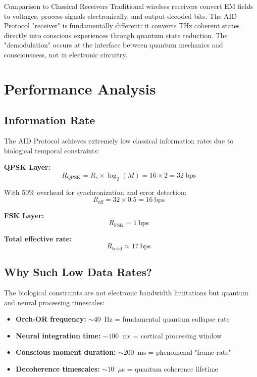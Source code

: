 \begin{calloutbox}{Comparison to Classical Receivers}
Traditional wireless receivers convert EM fields to voltages, process signals electronically, and output decoded bits. The AID Protocol "receiver" is fundamentally different: it converts THz coherent states directly into conscious experiences through quantum state reduction. The "demodulation" occurs at the interface between quantum mechanics and consciousness, not in electronic circuitry.
\end{calloutbox}

\section{Performance Analysis}

\subsection{Information Rate}

The AID Protocol achieves extremely low classical information rates due to biological temporal constraints:

\textbf{QPSK Layer:}
\begin{equation}
R_{\text{QPSK}} = R_s \times \log_2(M) = 16 \times 2 = 32~\text{bps}
\end{equation}

With 50\% overhead for synchronization and error detection:
\begin{equation}
R_{\text{eff}} = 32 \times 0.5 = 16~\text{bps}
\end{equation}

\textbf{FSK Layer:}
\begin{equation}
R_{\text{FSK}} = 1~\text{bps}
\end{equation}

\textbf{Total effective rate:}
\begin{equation}
R_{\text{total}} \approx 17~\text{bps}
\end{equation}

\subsection{Why Such Low Data Rates?}

The biological constraints are not electronic bandwidth limitations but quantum and neural processing timescales:

\begin{itemize}
\item \textbf{Orch-OR frequency:} $\sim 40$~Hz = fundamental quantum collapse rate
\item \textbf{Neural integration time:} $\sim 100$~ms = cortical processing window
\item \textbf{Conscious moment duration:} $\sim 200$~ms = phenomenal "frame rate"
\item \textbf{Decoherence timescales:} $\sim 10$~$\mu$s = quantum coherence lifetime
\end{itemize}

